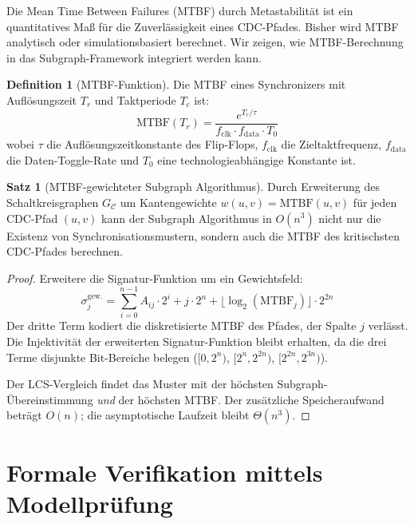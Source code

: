 ﻿\documentclass[a4paper,12pt]{article}
\theoremstyle{definition}
\newtheorem{definition}{Definition}
\newtheorem{satz}{Satz}
\begin{document}
	Die Mean Time Between Failures (MTBF) durch Metastabilit\"at ist
	ein quantitatives Ma\ss{} f\"ur die Zuverl\"assigkeit eines CDC-Pfades.
	Bisher wird MTBF analytisch oder simulationsbasiert berechnet.
	Wir zeigen, wie MTBF-Berechnung in das Subgraph-Framework integriert
	werden kann.
	
	\begin{definition}[MTBF-Funktion]
		Die MTBF eines Synchronizers mit Aufl\"osungszeit $T_r$ und
		Taktperiode $T_c$ ist:
		\[
		\mathrm{MTBF}(T_r) = \frac{e^{T_r / \tau}}{f_{\mathrm{clk}} \cdot f_{\mathrm{data}} \cdot T_0}
		\]
		wobei $\tau$ die Aufl\"osungszeitkonstante des Flip-Flops,
		$f_{\mathrm{clk}}$ die Zieltaktfrequenz, $f_{\mathrm{data}}$ die
		Daten-Toggle-Rate und $T_0$ eine technologieabh\"angige Konstante ist.
	\end{definition}
	
	\begin{satz}[MTBF-gewichteter Subgraph Algorithmus]
		\label{satz:mtbf}
		Durch Erweiterung des Schaltkreisgraphen $G_{\mathcal{C}}$ um
		Kantengewichte $w(u,v) = \mathrm{MTBF}(u, v)$ f\"ur jeden CDC-Pfad $(u,v)$
		kann der Subgraph Algorithmus in $O(n^3)$ nicht nur die Existenz von
		Synchronisationsmustern, sondern auch die MTBF des kritischsten
		CDC-Pfades berechnen.
	\end{satz}
	
	\begin{proof}
		Erweitere die Signatur-Funktion um ein Gewichtsfeld:
		\[
		\sigma_j^{\mathrm{gew.}} = \sum_{i=0}^{n-1} A_{ij} \cdot 2^i + j \cdot 2^n
		+ \lfloor \log_2(\mathrm{MTBF}_j) \rfloor \cdot 2^{2n}
		\]
		Der dritte Term kodiert die diskretisierte MTBF des Pfades, der
		Spalte $j$ verlässt. Die Injektivit\"at der erweiterten Signatur-Funktion
		bleibt erhalten, da die drei Terme disjunkte Bit-Bereiche belegen
		($[0, 2^n)$, $[2^n, 2^{2n})$, $[2^{2n}, 2^{3n})$).
		
		Der LCS-Vergleich findet das Muster mit der h\"ochsten Subgraph-\"Ubereinstimmung
		\emph{und} der h\"ochsten MTBF. Der zus\"atzliche Speicheraufwand betr\"agt
		$O(n)$; die asymptotische Laufzeit bleibt $\Theta(n^3)$. \qedhere
	\end{proof}
	
	\section{Formale Verifikation mittels Modellpr\"ufung}
	
\end{document}
